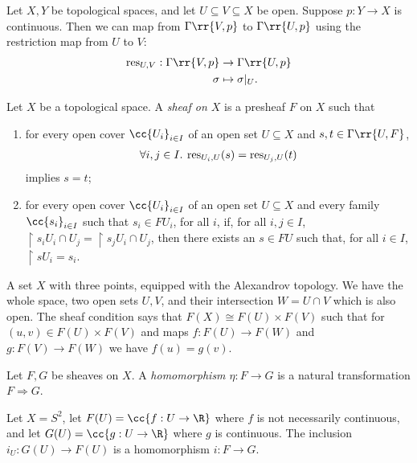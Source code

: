 \documentclass{article}
\begin{document}
\begin{example}
  Let $X, Y$ be topological spaces, and let $U \subseteq V \subseteq X$ be open.
  Suppose $p : Y \to X$ is continuous. Then we can map from $\Gamma\rr{V,p}$ to 
  $\Gamma\rr{U,p}$ using the restriction map from $U$ to $V$:
  \begin{align*}
    \res_{U,V} : \Gamma\rr{V,p} &\to \Gamma\rr{U,p}\\
    \sigma &\mapsto \sigma|_U.
  \end{align*}
\end{example}

\begin{definition}
  Let $X$ be a topological space. A \emph{sheaf on $X$} is a presheaf $F$ on $X$
  such that
  \begin{enumerate}
    \item for every open cover $\cc{U_i}_{i\in I}$ of an open set $U\subseteq X$ and
      $s,t\in\Gamma\rr{U,F}$,
      \begin{align*}
        \forall i,j\in I.\: \operatorname{res}_{U_i,U}(s) = \operatorname{res}_{U_j,U}(t)
      \end{align*}
      implies $s=t$;
    \item for every open cover $\cc{U_i}_{i\in I}$ of an open set $U\subseteq X$
      and every family $\cc{s_i}_{i\in I}$ such that $s_i\in FU_i$, for all $i$,
      if, for all $i,j\in I$, $\restriction{s_i}{U_i\cap U_j} = \restriction{s_j}{U_i\cap U_j}$,
      then there exists an $s\in FU$ such that, for all $i\in I$,
      $\restriction{s}{U_i}=s_i$.
  \end{enumerate}
\end{definition}

\begin{example}
  A set $X$ with three points, equipped with the Alexandrov topology. 
  We have the whole space, two open sets $U, V$, and their intersection $W = U \cap V$ which is also open. 
  The sheaf condition says that $F(X) \cong F(U) \times F(V)$ such that for $(u, v) \in  F(U) \times F(V)$ and 
  maps $f : F(U) \to F(W)$ and $g : F(V) \to F(W)$ we have $f(u) = g(v)$. 
  \missingexample
\end{example}

\begin{definition}
  Let $F,G$ be sheaves on $X$. A \emph{homomorphism $\eta:F\to G$} is
  a natural transformation $F\Rightarrow G$.
\end{definition}

\begin{example}
  Let $X = S^2$, let $F(U) = \cc{f : U \to \R}$ where $f$ is not necessarily continuous, 
  and let $G(U) = \cc{g : U \to \R}$ where $g$ is continuous. 
  The inclusion $i_U : G(U) \to F(U)$ is a homomorphism $i : F \to G$. 
\end{example}
\end{document}
